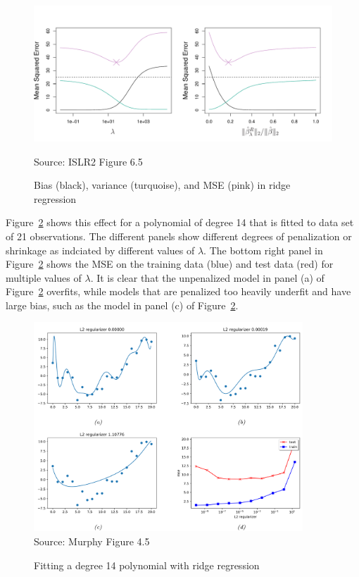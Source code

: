 \begin{figure}
\centering
\includegraphics[width=.9\textwidth]{../class11/Figures_Chapters_1-6/Chapter6/6_5.pdf}

\scriptsize Source: ISLR2 Figure 6.5 \normalsize \\

\caption[Bias, variance, and MSE in ridge regression]{Bias (black), variance (turquoise), and MSE (pink) in ridge regression}
\label{fig:ridgebias}
\end{figure}

Figure~\ref{fig:ridgemultiple} shows this effect for a polynomial of degree 14 that is fitted to data set of 21 observations. The different panels show different degrees of penalization or shrinkage as indciated by different values of $\lambda$. The bottom right panel in Figure~\ref{fig:ridgemultiple} shows the MSE on the training data (blue) and test data (red) for multiple values of $\lambda$. It is clear that the unpenalized model in panel (a) of Figure~\ref{fig:ridgemultiple} overfits, while models that are penalized too heavily underfit and have large bias, such as the model in panel (c) of Figure~\ref{fig:ridgemultiple}. 

\begin{figure}
\centering
\includegraphics[width=0.9\textwidth]{screen4.png}\\
\scriptsize Source: Murphy Figure 4.5

\caption{Fitting a degree 14 polynomial with ridge regression}
\label{fig:ridgemultiple}
\end{figure}

